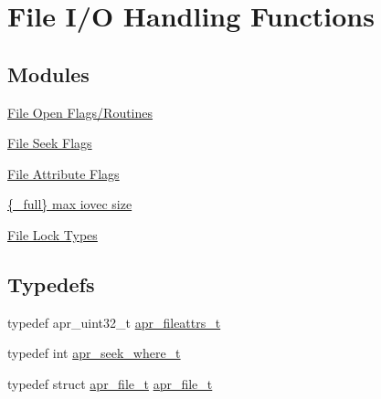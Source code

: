 \hypertarget{group__apr__file__io}{\section{File I/\-O Handling Functions}
\label{group__apr__file__io}
}
\subsection*{Modules}
\begin{DoxyCompactItemize}
\item 
\hyperlink{group__apr__file__open__flags}{File Open Flags/\-Routines}
\item 
\hyperlink{group__apr__file__seek__flags}{File Seek Flags}
\item 
\hyperlink{group__apr__file__attrs__set__flags}{File Attribute Flags}
\item 
\hyperlink{group__apr__file__writev}{\{\-\_\-full\} max iovec size}
\item 
\hyperlink{group__apr__file__lock__types}{File Lock Types}
\end{DoxyCompactItemize}
\subsection*{Typedefs}
\begin{DoxyCompactItemize}
\item 
typedef apr\-\_\-uint32\-\_\-t \hyperlink{group__apr__file__io_ga11fbee5a7a3f3d45fff5c31df0db9737}{apr\-\_\-fileattrs\-\_\-t}
\item 
typedef int \hyperlink{group__apr__file__io_ga8eecd44975906042e0e369771802a145}{apr\-\_\-seek\-\_\-where\-\_\-t}
\item 
typedef struct \hyperlink{group__apr__file__io_gaa46e4763ac375ea3c7a43ba6f6099e22}{apr\-\_\-file\-\_\-t} \hyperlink{group__apr__file__io_gaa46e4763ac375ea3c7a43ba6f6099e22}{apr\-\_\-file\-\_\-t}
\end{DoxyCompactItemize}
